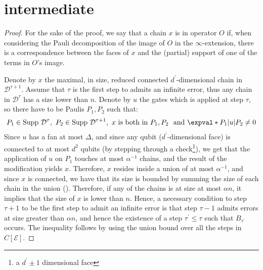 \section{intermediate}

\begin{proof}
  For the sake of the proof, we say that a chain $x$ is in operator $O$ if, when considering the Pauli decomposition of the image of $O$ in the $\infty$-extension, there is a correspondence between the faces of $x$ and the (partial) support of one of the terms in $O$'s image.

  Denote by $x$ the maximal, in size, reduced connected $d^{\prime}$-dimensional chain in $\mathcal{D}^{\tau+1}$. Assume that $\tau$ is the first step to admits an infinite error, thus any chain in $\mathcal{D}^{\tau}$ has a size lower than $n$. Denote by $u$ the gates which is applied at step $\tau$, so there have to be Paulis $P_{1},P_{2}$ such that: 
  \begin{equation*}
    \begin{split}
      P_{1} \in \text{Supp } \mathcal{D}^{\tau}, \, \,  P_{2} \in \text{Supp } \mathcal{D}^{\tau + 1}, \, \, x \text{ is both in } P_{1},P_{2}  \, \, \text{ and } \expval*{P_{1}|u|P_{2}} \neq 0
    \end{split}
  \end{equation*}
  Since $u$ has a fan at most $\Delta$, and since any qubit ($d^{\prime}$-dimensional face) is connected to at most $d^{2}$ qubits (by stepping through a check\footnote{a $d^{\prime}\pm1$ dimensional face}), we get that the application of $u$ on $P_{1}$ touches at most $\alpha^{-1}$ chains, and the result of the modification yields $x$. Therefore, $x$ resides inside a union of at most $\alpha^{-1}$, and since $x$ is connected, we have that its size is bounded by summing the size of each chain in the union (). Therefore, if any of the chains is at size at most $\alpha n$, it implies that the size of $x$ is lower than $n$. Hence, a necessary condition to step $\tau+1$ to be the first step to admit an infinite error is that step $\tau-1$ admits errors at size greater than $\alpha n$, and hence the existence of a step $\tau^{\prime}\le \tau$ such that $B_{\tau^{\prime}}$ occurs. The inequality follows by using the union bound over all the steps in $C[\mathcal{E}]$.
\end{proof}

